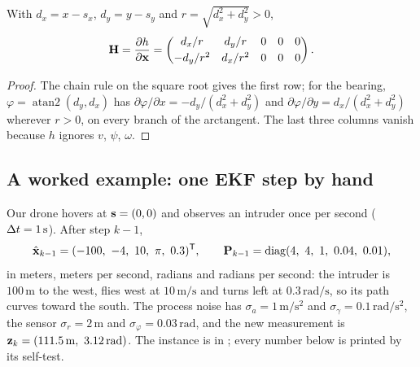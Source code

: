 \begin{proposition}
\label{thm:ch19-rb-jacobian}
With $d_x = x - s_x$, $d_y = y - s_y$ and $r = \sqrt{d_x^2 + d_y^2} > 0$,
\begin{equation}
  \mathbf{H} = \frac{\partial h}{\partial \mathbf{x}} =
  \begin{pmatrix}
    d_x/r & d_y/r & 0 & 0 & 0\\[0.6ex]
    -d_y/r^2 & d_x/r^2 & 0 & 0 & 0
  \end{pmatrix}.
  \label{eq:ch19-rb-jacobian}
\end{equation}
\end{proposition}
\begin{proof}
The chain rule on the square root gives the first row; for the bearing,
$\varphi = \operatorname{atan2}(d_y, d_x)$ has $\partial\varphi/\partial x =
-d_y/(d_x^2 + d_y^2)$ and $\partial\varphi/\partial y = d_x/(d_x^2 + d_y^2)$
wherever $r > 0$, on every branch of the arctangent. The last three columns
vanish because $h$ ignores $v$, $\psi$, $\omega$.
\end{proof}

\subsection{A worked example: one EKF step by hand}
\label{sec:ch19-ekf-example}

\begin{example}
\label{ex:ch19-ekf}
Our drone hovers at $\mathbf{s} = (0, 0)$ and observes an intruder once per
second ($\Delta t = 1\,\mathrm{s}$). After step $k-1$,
\[
  \hat{\state}_{k-1} = (-100,\ -4,\ 10,\ \pi,\ 0.3)\T, \qquad
  \mat{P}_{k-1} = \diag(4,\ 4,\ 1,\ 0.04,\ 0.01),
\]
in meters, meters per second, radians and radians per second: the intruder
is $100\,\mathrm{m}$ to the west, flies west at $10\,\mathrm{m/s}$ and turns
left at $0.3\,\mathrm{rad/s}$, so its path curves toward the south. The
process noise has $\sigma_a = 1\,\mathrm{m/s^2}$ and $\sigma_\gamma =
0.1\,\mathrm{rad/s^2}$, the sensor $\sigma_r = 2\,\mathrm{m}$ and
$\sigma_\varphi = 0.03\,\mathrm{rad}$, and the new measurement is $\mathbf{z}_k =
(111.5\,\mathrm{m},\ 3.12\,\mathrm{rad})$. The instance is
 in ; every number
below is printed by its self-test.
\end{example}

